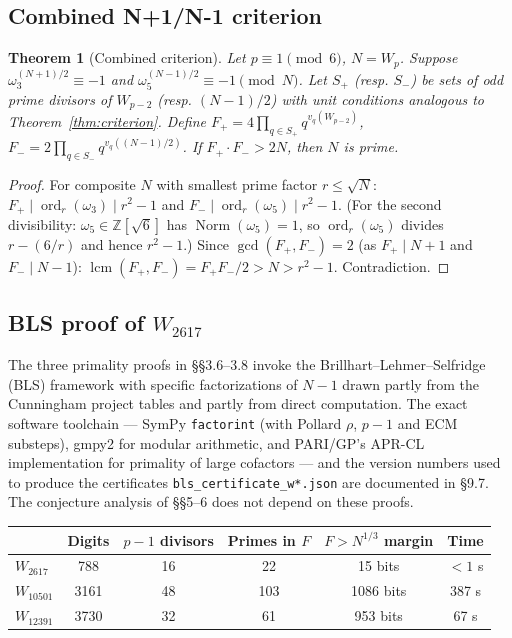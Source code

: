 \documentclass[12pt]{article}
\theoremstyle{plain}
\newtheorem{theorem}{Theorem}[section]
\theoremstyle{definition}
\theoremstyle{remark}
\begin{document}
\subsection{Combined N+1/N-1 criterion}


\begin{theorem}[Combined criterion]\label{thm:combined}
Let \(p \equiv 1 \pmod{6}\),
\(N = W_p\). Suppose \(\omega_3^{(N+1)/2} \equiv -1\) and
\(\omega_5^{(N-1)/2} \equiv -1 \pmod{N}\). Let \(S_+\) (resp. \(S_-\))
be sets of odd prime divisors of \(W_{p-2}\) (resp. \((N-1)/2\)) with
unit conditions analogous to Theorem~\ref{thm:criterion}. Define
\(F_+ = 4 \prod_{q \in S_+} q^{v_q(W_{p-2})}\),
\(F_- = 2 \prod_{q \in S_-} q^{v_q((N-1)/2)}\).
If \(F_+ \cdot F_- > 2N\), then \(N\) is prime.
\end{theorem}


\begin{proof}
For composite \(N\) with smallest prime factor
\(r \leq \sqrt{N}\): \(F_+ \mid \operatorname{ord}_r(\omega_3)
\mid r^2 - 1\) and \(F_- \mid \operatorname{ord}_r(\omega_5) \mid
r^2 - 1\). (For the second divisibility: \(\omega_5 \in
\mathbb{Z}[\sqrt{6}]\) has \(\operatorname{Norm}(\omega_5) = 1\),
so \(\operatorname{ord}_r(\omega_5)\) divides \(r - (6/r)\) and
hence \(r^2 - 1\).) Since \(\gcd(F_+, F_-) = 2\) (as
\(F_+ \mid N+1\) and \(F_- \mid N-1\)):
\(\operatorname{lcm}(F_+, F_-) = F_+ F_- / 2 > N > r^2 - 1\).
Contradiction.
\end{proof}


\subsection{BLS proof of \texorpdfstring{\(W_{2617}\)}{W\_2617}}


The three primality proofs in \S\S3.6--3.8 invoke the
Brillhart--Lehmer--Selfridge (BLS) framework with specific
factorizations of \(N-1\) drawn partly from the Cunningham project
tables and partly from direct computation. The exact software
toolchain --- SymPy \texttt{factorint} (with Pollard \(\rho\), \(p\!-\!1\)
and ECM substeps), gmpy2 for modular arithmetic, and PARI/GP's
APR-CL implementation \cite{ref6} for primality of
large cofactors --- and the version numbers used to produce the
certificates \texttt{bls\_certificate\_w*.json} are documented in \S9.7.
The conjecture analysis of \S\S5--6 does not depend on these proofs.

\begin{center}
\small
\begin{tabular}{lccccc}
\hline
 & Digits & \(p-1\) divisors & Primes in \(F\) & \(F > N^{1/3}\) margin & Time \\
\hline
\(W_{2617}\) & 788 & 16 & 22 & 15 bits & \(<1\) s \\
\(W_{10501}\) & 3161 & 48 & 103 & 1086 bits & 387 s \\
\(W_{12391}\) & 3730 & 32 & 61 & 953 bits & 67 s \\
\hline
\end{tabular}
\end{center}
\end{document}
